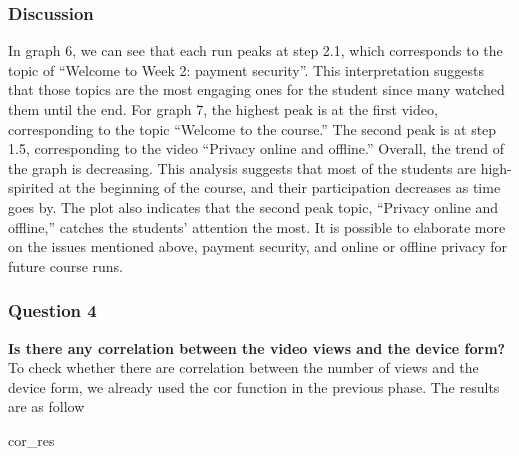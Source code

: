 \documentclass[12pt,]{article}
\newenvironment{Shaded}{\begin{snugshade}}{\end{snugshade}}
\newcommand{\NormalTok}[1]{#1}
\begin{document}
\hypertarget{discussion-2}{%
\subsubsection{Discussion}\label{discussion-2}}

In graph 6, we can see that each run peaks at step 2.1, which
corresponds to the topic of ``Welcome to Week 2: payment security''.
This interpretation suggests that those topics are the most engaging
ones for the student since many watched them until the end. For graph 7,
the highest peak is at the first video, corresponding to the topic
``Welcome to the course.'' The second peak is at step 1.5, corresponding
to the video ``Privacy online and offline.'' Overall, the trend of the
graph is decreasing. This analysis suggests that most of the students
are high-spirited at the beginning of the course, and their
participation decreases as time goes by. The plot also indicates that
the second peak topic, ``Privacy online and offline,'' catches the
students' attention the most. It is possible to elaborate more on the
issues mentioned above, payment security, and online or offline privacy
for future course runs.

\hypertarget{question-4-1}{%
\subsubsection{Question 4}\label{question-4-1}}

\textbf{Is there any correlation between the video views and the device
form?}\\
\hfill\break To check whether there are correlation between the number
of views and the device form, we already used the cor function in the
previous phase. The results are as follow

\tiny

\begin{Shaded}
\begin{Highlighting}[]
\NormalTok{cor\_res}
\end{Highlighting}
\end{Shaded}
\end{document}
